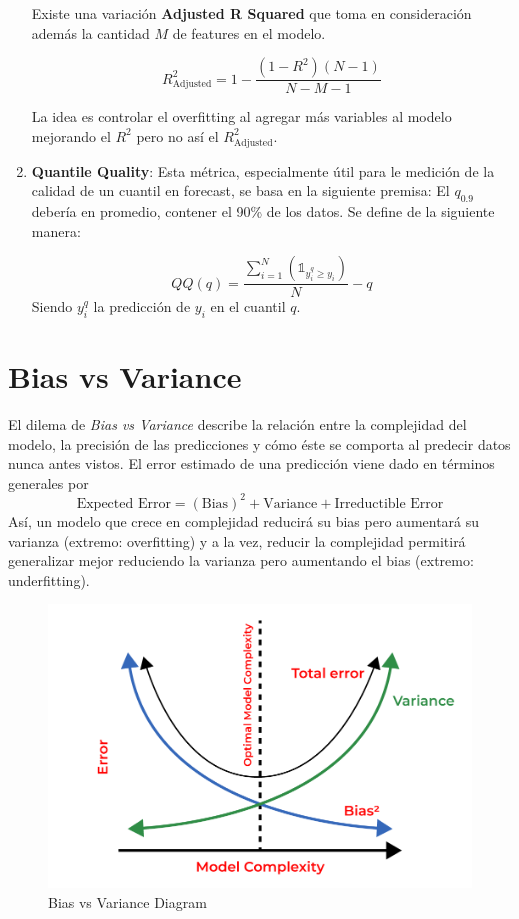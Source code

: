 \begin{enumerate}
    Existe una variación \textbf{Adjusted R Squared} que toma en consideración además la cantidad $M$ de features en el modelo. 

    $$
    R^2_{\text{Adjusted}} = 1 - \frac{(1-R^2)(N-1)}{N-M-1}
    $$

    La idea es controlar el overfitting al agregar más variables al modelo mejorando el $R^2$ pero no así el $R^2_{\text{Adjusted}}$.

    \item \textbf{Quantile Quality}: Esta métrica, especialmente útil para le medición de la calidad de un cuantil en forecast, se basa en la siguiente premisa: El $q_{0.9}$ debería en promedio, contener el 90\% de los datos. Se define de la siguiente manera: 

    $$
    QQ(q) = \frac{\sum_{i=1}^N (\mathds{1}_{y^{q}_i \geq y_i})}{N} - q
    $$
    Siendo $y^{q}_i$ la predicción de $y_i$ en el cuantil $q$. 
    
     
\end{enumerate}

\section{Bias vs Variance}

El dilema de \textit{Bias vs Variance} describe la relación entre la complejidad del modelo, la precisión de las predicciones y cómo éste se comporta al predecir datos nunca antes vistos. El error estimado de una predicción viene dado en términos generales por 
$$
\text{Expected Error} = (\text{Bias})^2 + \text{Variance} + \text{Irreductible Error}
$$
Así, un modelo que crece en complejidad reducirá su bias pero aumentará su varianza (extremo: overfitting) y a la vez, reducir la complejidad permitirá generalizar mejor reduciendo la varianza pero aumentando el bias (extremo: underfitting). 

\begin{figure}[H]
    \center
    \includegraphics[scale=0.27]{notebooks/Basic/img/bias_vs_variance.png}
    \caption{Bias vs Variance Diagram}
\end{figure}
